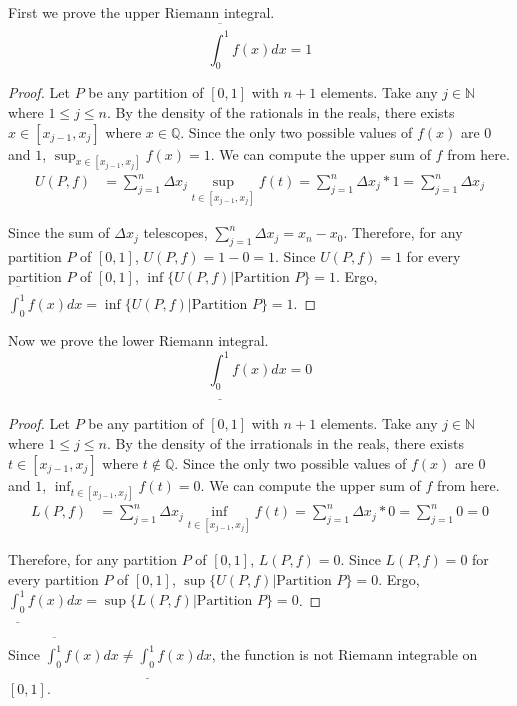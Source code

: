 \documentclass[11pt]{article}
\begin{document}
        First we prove the upper Riemann integral.
        \begin{equation}
            \overline{\int_{0}^{1}} f(x) dx = 1
        \end{equation}
        \begin{proof}
            Let $P$ be any partition of $[0,1]$ with $n + 1$ elements.
            Take any $j \in \mathbb{N}$ where $1 \leq j \leq n$.
            By the density of the rationals in the reals, there exists $x \in [x_{j-1},x_j]$ where $x \in \mathbb{Q}$.
            Since the only two possible values of $f(x)$ are $0$ and $1$, $\sup_{x \in [x_{j-1},x_j]} f(x) = 1$.
            We can compute the upper sum of $f$ from here.
            \begin{align}
                U(P,f)  &=  \sum_{j = 1}^{n} \Delta x_j \sup_{t \in [x_{j-1},x_j]} f(t)
                    =   \sum_{j = 1}^{n} \Delta x_j * 1
                    =   \sum_{j = 1}^{n} \Delta x_j
            \end{align}

            Since the sum of $\Delta x_j$ telescopes, $\sum_{j = 1}^{n} \Delta x_j = x_n - x_0$.
            Therefore, for any partition $P$ of $[0,1]$, $U(P,f) = 1 - 0 = 1$.
            Since $U(P,f) = 1$ for every partition $P$ of $[0,1]$, $\inf \{ U(P,f) | \text{Partition } P \} = 1$.
            Ergo, $\overline{\int_{0}^{1}} f(x) dx = \inf \{ U(P,f) | \text{Partition } P \} = 1$.
        \end{proof}

        Now we prove the lower Riemann integral.
        \begin{equation}
            \underline{\int_{0}^{1}} f(x) dx = 0
        \end{equation}
        \begin{proof}
            Let $P$ be any partition of $[0,1]$ with $n + 1$ elements.
            Take any $j \in \mathbb{N}$ where $1 \leq j \leq n$.
            By the density of the irrationals in the reals, there exists $t \in [x_{j-1},x_j]$ where $t \notin \mathbb{Q}$.
            Since the only two possible values of $f(x)$ are $0$ and $1$, $\inf_{t \in [x_{j-1},x_j]} f(t) = 0$.
            We can compute the upper sum of $f$ from here.
            \begin{align}
                L(P,f)  &=  \sum_{j = 1}^{n} \Delta x_j \inf_{t \in [x_{j-1},x_j]} f(t)
                    =   \sum_{j = 1}^{n} \Delta x_j * 0
                    =   \sum_{j = 1}^{n} 0
                    =   0
            \end{align}

            Therefore, for any partition $P$ of $[0,1]$, $L(P,f) = 0$.
            Since $L(P,f) = 0$ for every partition $P$ of $[0,1]$, $\sup \{ U(P,f) | \text{Partition } P \} = 0$.
            Ergo, $\underline{\int_{0}^{1}} f(x) dx = \sup \{ L(P,f) | \text{Partition } P \} = 0$.
        \end{proof}

        Since $\overline{\int_{0}^{1}} f(x) dx \neq \underline{\int_{0}^{1}} f(x) dx$, the function is not Riemann integrable on $[0,1]$.
\end{document}
